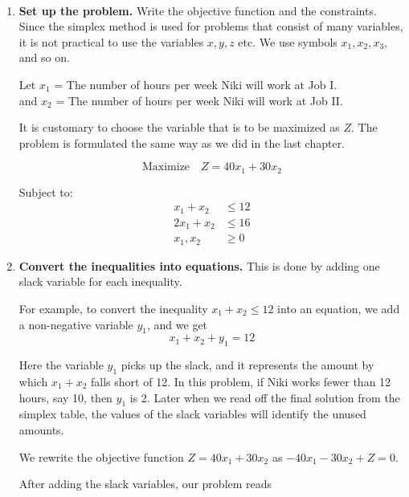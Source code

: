 \begin{solution}
    ~\\
    \begin{enumerate}
        \item \textbf{Set up the problem.}
              Write the objective function and the constraints. Since the simplex method is used for problems that consist of many variables, it is not practical to use the variables $x, y, z$ etc. We use symbols $x_1, x_2, x_3$, and so on.

              Let $x_1$ = The number of hours per week Niki will work at Job I. \\
              and $x_2$ = The number of hours per week Niki will work at Job II.

              It is customary to choose the variable that is to be maximized as $Z$. The problem is formulated the same way as we did in the last chapter.

              \[
                  \text{Maximize} \quad Z = 40x_1 + 30x_2
              \]

              Subject to:
              \begin{align*}
                  x_1 + x_2  & \leq 12 \\
                  2x_1 + x_2 & \leq 16 \\
                  x_1, x_2   & \geq 0
              \end{align*}

        \item \textbf{Convert the inequalities into equations.}
              This is done by adding one slack variable for each inequality.

              For example, to convert the inequality \( x_1 + x_2 \leq 12 \) into an equation, we add a non-negative variable \( y_1 \), and we get
              \[ x_1 + x_2 + y_1 = 12 \]

              Here the variable \( y_1 \) picks up the slack, and it represents the amount by which \( x_1 + x_2 \) falls short of 12. In this problem, if Niki works fewer than 12 hours, say 10, then \( y_1 \) is 2. Later when we read off the final solution from the simplex table, the values of the slack variables will identify the unused amounts.

              We rewrite the objective function \( Z = 40x_1 + 30x_2 \) as \( -40x_1 - 30x_2 + Z = 0 \).

              After adding the slack variables, our problem reads


\end{enumerate}
\end{solution}
